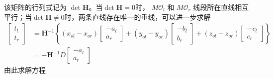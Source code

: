 该矩阵的行列式记为 $\det \mathbf{H} $。当$\det \mathbf{H} = 0$时， $M\mathcal{O}_l$ 和 $M\mathcal{O}_r$ 线段所在直线相互平行；当$\det \mathbf{H} \neq 0$时，两条直线存在唯一的垂线，可以进一步求解
\begin{align} 
\left[ {\begin{array}{*{20}{c}}
	{{t_l}} \\ 
	{{t_r}} 
	\end{array}} \right] &= {{\mathbf{H}}^{ - 1}}\left\{ {\left( {{x_{ol}} - {x_{or}}} \right)\left[ {\begin{array}{*{20}{c}}
		{ - {a_l}} \\ 
		{{a_r}} 
		\end{array}} \right] + \left( {{y_{ol}} - {y_{or}}} \right)\left[ {\begin{array}{*{20}{c}}
		{ - {b_l}} \\ 
		{{b_r}} 
		\end{array}} \right] + \left( {{z_{ol}} - {z_{or}}} \right)\left[ {\begin{array}{*{20}{c}}
		{ - {c_l}} \\ 
		{{c_r}} 
		\end{array}} \right]} \right\}\\ &=  - {{\mathbf{H}}^{ - 1}}D\left[ {\begin{array}{*{20}{c}}
	{ - {a_l}} \\ 
	{{a_r}} 
	\end{array}} \right]
\end{align}
由此求解方程
